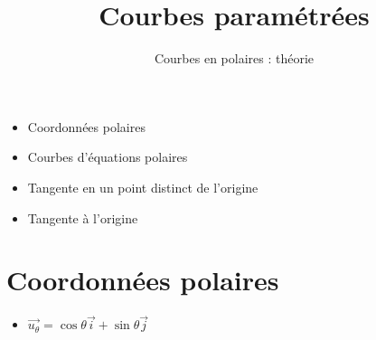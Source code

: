 

   





\title{{\bf Courbes paramétrées}}
\subtitle{Courbes en polaires : théorie}

\begin{frame}
  
  \debutmontitre

  \pause

{\footnotesize
\hfill
{}
\begin{minipage}{0.6\textwidth}
  \begin{itemize}
    \item<3-> Coordonnées polaires
    \item<4-> Courbes d'équations polaires
    \item<5-> Tangente en un point distinct de l'origine
    \item<6-> Tangente à l'origine   
  \end{itemize}
\end{minipage}
}

\end{frame}

\setcounter{framenumber}{0}



\section{Coordonnées polaires}

\begin{frame}

\begin{itemize}
  \item $\overrightarrow{u_\theta}=\cos\theta\overrightarrow{i}+\sin\theta\overrightarrow{j}$
  

  
    
\end{itemize}






\end{frame}



